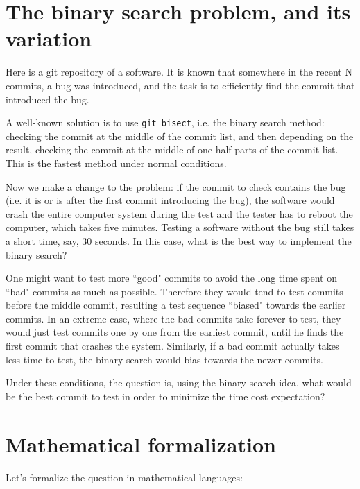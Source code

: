 \documentclass[]{article}
\begin{document}
	
\theoremstyle{definition}
\newtheorem{definition}{Definition}
\newtheorem{problem}{Problem}

\theoremstyle{plain}
\newtheorem{lemma}{Proposition}

\section{The binary search problem, and its variation}

Here is a git repository of a software. It is known that somewhere in the recent N commits, a bug was introduced, and the task is to efficiently find the commit that introduced the bug.

A well-known solution is to use \texttt{git bisect}, i.e. the binary search method: checking the commit at the middle of the commit list, and then depending on the result, checking the commit at the middle of one half parts of the commit list. This is the fastest method under normal conditions.

Now we make a change to the problem: if the commit to check contains the bug (i.e. it is or is after the first commit introducing the bug), the software would crash the entire computer system during the test and the tester has to reboot the computer, which takes five minutes. Testing a software without the bug still takes a short time, say, 30 seconds. In this case, what is the best way to implement the binary search?

One might want to test more ``good" commits to avoid the long time spent on ``bad" commits as much as possible. Therefore they would tend to test commits before the middle commit, resulting a test sequence ``biased" towards the earlier commits. In an extreme case, where the bad commits take forever to test, they would just test commits one by one from the earliest commit, until he finds the first commit that crashes the system. Similarly, if a bad commit actually takes less time to test, the binary search would bias towards the newer commits.

Under these conditions, the question is, using the binary search idea, what would be the best commit to test in order to minimize the time cost expectation?

\section{Mathematical formalization}

Let's formalize the question in mathematical languages:
\end{document}
